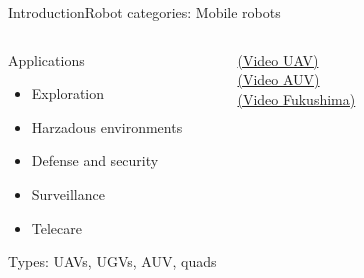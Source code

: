 \documentclass[10pt,compress]{beamer} %
\begin{document}
\begin{frame}{Introduction}{Robot categories: Mobile robots}
   \begin{columns}
	   \begin{block}{Applications}
	   \begin{itemize}
	   \item Exploration
	   \item Harzadous environments
	   \item Defense and security
	   \item Surveillance
	   \item Telecare
	   \end{itemize}
	   Types: UAVs, UGVs, AUV, quads
	   \end{block}

	   \href{https://www.youtube.com/watch?v=oO\_Ohp1pHBw}{(Video UAV)}\\
	   \href{https://www.youtube.com/watch?v=ScTxzbZswdE}{(Video AUV)}\\
	   \href{https://www.youtube.com/watch?v=scc9cbsBKgM}{(Video Fukushima)}
	   

\end{columns}
\end{frame}
\end{document}
